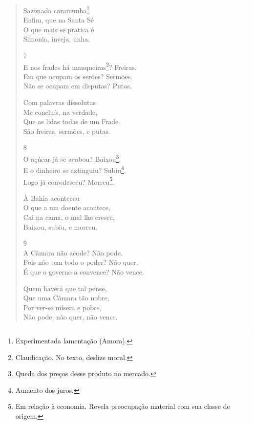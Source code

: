 \begin{verse}
\hspace{5em} Sazonada caramunha\footnote{Experimentada lamentação (Amora).} \\
\hspace{5em} Enfim, que na Santa Sé \\
\hspace{5em} O que mais se pratica é \\
\hspace{5em} Simonia, inveja, unha.
			
7 \\
E nos frades há manqueiras\footnote{Claudicação. No texto, deslize moral.}? \dotfill Freiras. \\
Em que ocupam os serões? \dotfill Sermões. \\
Não se ocupam em disputas? \dotfill Putas.
			
\hspace{5em} Com palavras dissolutas \\
\hspace{5em} Me concluís, na verdade, \\
\hspace{5em} Que as lidas todas de um Frade\\
\hspace{5em} São freiras, sermões, e putas.
			
8 \\
O açúcar já se acabou? \dotfill Baixou\footnote{Queda dos preços desse produto no mercado.}. \\
E o dinheiro se extinguiu? \dotfill Subiu\footnote{Aumento dos juros.}. \\
Logo já convalesceu? \dotfill Morreu\footnote{Em relação à economia. Revela preocupação material com sua classe de origem.}.
			
\hspace{5em} À Bahia aconteceu \\
\hspace{5em} O que a um doente acontece, \\
\hspace{5em} Cai na cama, o mal lhe cresce, \\
\hspace{5em} Baixou, subiu, e morreu.
			
9 \\
A Câmara não acode? \dotfill Não pode. \\
Pois não tem todo o poder? \dotfill Não quer. \\
É que o governo a convence? \dotfill Não vence.
			
\hspace{5em} Quem haverá que tal pense, \\
\hspace{5em} Que uma Câmara tão nobre, \\
\hspace{5em} Por ver-se mísera e pobre, \\
\hspace{5em} Não pode, não quer, não vence. 
\end{verse}

